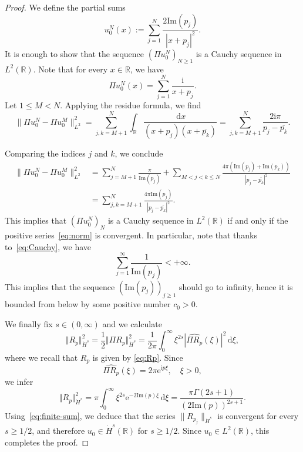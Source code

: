 \documentclass[english, 12pt]{amsart}%
\newcommand{\R}{\mathbb{R}}
\newcommand{\ii}{\mathrm{i}}
\newcommand{\dd}{\,\mathrm{d}}
\renewcommand{\Im}{\mathrm{Im}}
\numberwithin{equation}{section}
\begin{document}
\begin{proof}
We define the partial sums
\begin{equation}\label{eq:u0N}
u_0^N(x):=\sum_{j=1}^N \frac{2\Im(p_j)}{|x+p_j|^2}.
\end{equation}
It is enough to show that the sequence $(\Pi u_0^N)_{N\geq 1}$ is a Cauchy sequence in $L^2(\R)$. Note that for every $x\in\R$, we have
\[
\Pi u_0^N(x)
	=\sum_{j=1}^N\frac{\ii}{x+p_j}.
\]
Let $1\leq M<N$. Applying the residue formula, we find
\begin{equation*}
\|\Pi u_0^N-\Pi u_0^M\|_{L^2}^2
	=\sum_{j,k=M+1}^{N}\int_{\R}\frac{\dd x}{(x+p_j)(x+\overline{p_k})}
	=\sum_{j,k=M+1}^{N} \frac{2\ii \pi}{p_j-\overline{p_k}}.
\end{equation*}

Comparing the indices $j$ and $k$, we conclude
\begin{align}\label{eq:Cauchy}
\|\Pi u_0^N-\Pi u_0^M\|_{L^2}^2
	&=\sum_{j=M+1}^N \frac{\pi}{\Im(p_j)}
	+\sum_{M<j<k\leq N}\frac{4\pi(\Im(p_j)+\Im(p_k))}{|p_j-\overline{p_k}|^2}\\ \nonumber
	&=\sum_{j,k=M+1}^N \frac{4\pi\Im(p_j)}{|p_j-\overline{p_k}|^2}.
\end{align}
This implies that $(\Pi u_0^N)_N$ is a Cauchy sequence in $L^2(\R)$ if and only if the positive series~\eqref{eq:norm} is convergent. In particular, note that thanks to~\eqref{eq:Cauchy}, we have
\begin{equation}\label{eq:finite-sum}
\sum_{j=1}^\infty \frac{1}{\Im (p_j)}<+\infty.
\end{equation}
This implies that the sequence $(\Im(p_j))_{j\geq 1}$ should go to infinity, hence it is bounded from below by some positive number $c_0>0$.

We finally fix $s\in (0,\infty)$ and we calculate 
\[ \Vert R_p\Vert_{\dot H^s}^2=\frac 12 \Vert \Pi R_p\Vert_{\dot H^s}^2=\frac{1}{2\pi}\int_0^\infty \xi ^{2s}|\widehat{\Pi R_p}(\xi)|^2\dd\xi ,\]
where we recall that $R_p$ is given by \eqref{eq:Rp}. 
Since 
\[ \widehat{\Pi R_p}(\xi )=2\pi {\mathrm{e}}^{\ii p\xi},
\quad \xi >0,
\]
we infer
\begin{equation}\label{eq:RpdotHs}
\Vert R_p\Vert_{\dot H^s}^2 =\pi \int_0^\infty \xi ^{2s}{\mathrm{e}}^{-2\Im(p)\xi}\dd\xi =\frac{\pi \Gamma (2s+1)}{(2\Im (p))^{2s+1}}.
\end{equation}
Using~\eqref{eq:finite-sum}, we deduce that the series $\| R_{p_j}\|_{\dot H^s}$ is convergent for every $s\geq 1/2$, and therefore $u_0\in \dot H^s(\R)$ for $s\geq 1/2$. Since $u_0\in L^2(\R)$, this completes the proof.
\end{proof}
\end{document}
